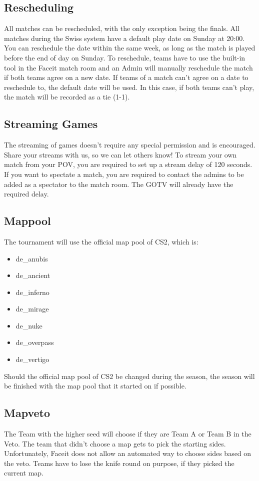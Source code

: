 \documentclass{article}
\newcommand{\TeamA}{{\color{red}Team A }}
\newcommand{\TeamB}{{\color{blue}Team B }}
\begin{document}
\subsection{Rescheduling}
All matches can be rescheduled, with the only exception being the finals. All matches during the Swiss system have a default play date on Sunday at 20:00. You can reschedule the date within the same week, as long as the match is played before the end of day
on Sunday. To reschedule, teams have to use the built-in tool in the Faceit match room and an Admin will manually reschedule the match if both teams agree on a new date. If teams of a match can't agree on a date to reschedule to, the default date will be used. In this case, if both teams can't play, the match will be recorded as a tie (1-1).

\subsection{Streaming Games}
The streaming of games doesn't require any special permission and is encouraged. Share your streams with us, so we can let others know! To stream your own match from your POV, you are required to set up a stream delay of 120 seconds. If you want to spectate a match, you are required to contact the admins to be added as a spectator to the match room. The GOTV will already have the required delay.


\subsection{Mappool}
The tournament will use the official map pool of CS2, which is:
\begin{itemize}
    \item de\_anubis
    \item de\_ancient
    \item de\_inferno
    \item de\_mirage
    \item de\_nuke
    \item de\_overpass
    \item de\_vertigo 
\end{itemize}
Should the official map pool of CS2 be changed during the season, the season will be finished with the map pool that it started on if possible.


\subsection{Mapveto}
The Team with the higher seed will choose if they are \TeamA or \TeamB in the Veto. The team that didn't choose a map gets to pick the starting sides. Unfortunately, Faceit does not allow an automated way to choose sides based on the veto. Teams have to lose the knife round on purpose, if they picked the current map.\\
\end{document}
